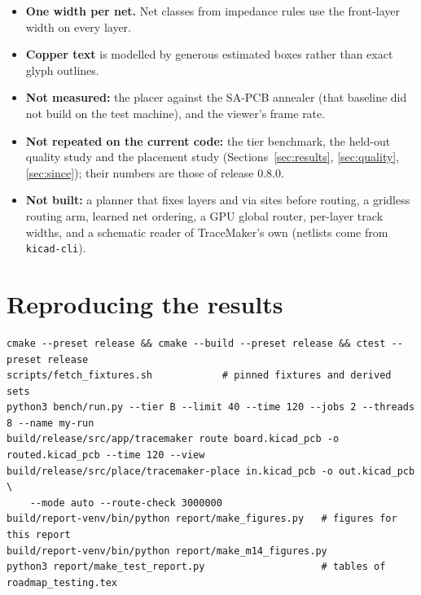\documentclass[10pt,a4paper]{article}
\begin{document}
\begin{itemize}[leftmargin=*]
  edition.
  \item \textbf{One width per net.} Net classes from impedance rules use the front-layer width on every layer.
  \item \textbf{Copper text} is modelled by generous estimated boxes rather than exact glyph outlines.
  \item \textbf{Not measured:} the placer against the SA-PCB annealer (that baseline did not build on the test
  machine), and the viewer's frame rate.
  \item \textbf{Not repeated on the current code:} the tier benchmark, the held-out quality study and the placement
  study (Sections~\ref{sec:results}, \ref{sec:quality}, \ref{sec:since}); their numbers are those of release 0.8.0.
  \item \textbf{Not built:} a planner that fixes layers and via sites before routing, a gridless routing arm, learned net ordering, a GPU global router, per-layer track
  widths, and a schematic reader of TraceMaker's own (netlists come from \texttt{kicad-cli}).
\end{itemize}

\appendix
\section{Reproducing the results}
\begin{small}
\begin{verbatim}
cmake --preset release && cmake --build --preset release && ctest --preset release
scripts/fetch_fixtures.sh            # pinned fixtures and derived sets
python3 bench/run.py --tier B --limit 40 --time 120 --jobs 2 --threads 8 --name my-run
build/release/src/app/tracemaker route board.kicad_pcb -o routed.kicad_pcb --time 120 --view
build/release/src/place/tracemaker-place in.kicad_pcb -o out.kicad_pcb \
    --mode auto --route-check 3000000
build/report-venv/bin/python report/make_figures.py   # figures for this report
build/report-venv/bin/python report/make_m14_figures.py
python3 report/make_test_report.py                    # tables of roadmap_testing.tex
\end{verbatim}
\end{small}
\end{document}

